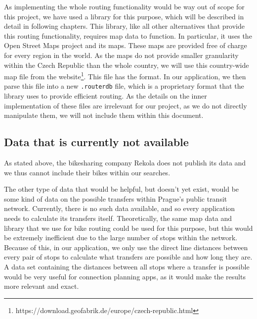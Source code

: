 As implementing the whole routing functionality would be way out of scope for this project, we have used a library for this purpose, which will be described in detail in following chapters. This library, like all other alternatives that provide this routing functionality, requires map data to function. In particular, it uses the Open Street Maps project and its maps. These maps are provided free of charge for every region in the world. As the maps do not provide smaller granularity within the Czech Republic than the whole country, we will use this country-wide map file from the website\footnote{https://download.geofabrik.de/europe/czech-republic.html}. This file has the  format. In our application, we then parse this file into a new \texttt{.routerdb} file, which is a proprietary format that the library uses to provide efficient routing. As the details on the inner implementation of these files are irrelevant for our project, as we do not directly manipulate them, we will not include them within this document.

\subsection{Data that is currently not available}

As stated above, the bikesharing company Rekola does not publish its data and we thus cannot include their bikes within our searches.

The other type of data that would be helpful, but doesn't yet exist, would be some kind of data on the possible transfers within Prague's public transit network. Currently, there is no such data available, and so every application needs to calculate its transfers itself. Theoretically, the same map data and library that we use for bike routing could be used for this purpose, but this would be extremely inefficient due to the large number of stops within the network. Because of this, in our application, we only use the direct line distances between every pair of stops to calculate what transfers are possible and how long they are. A data set containing the distances between all stops where a transfer is possible would be very useful for connection planning apps, as it would make the results more relevant and exact.



